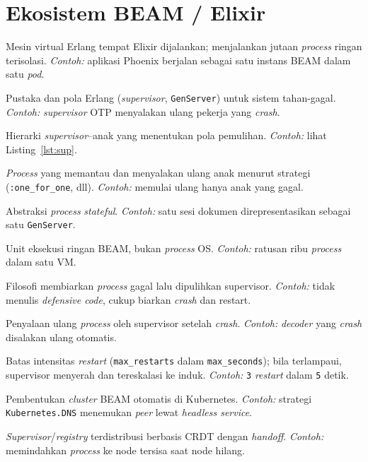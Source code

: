 \section{Ekosistem BEAM / Elixir}
\begin{description}[style=nextline,leftmargin=1.4em]
  \item[BEAM] Mesin virtual Erlang tempat Elixir dijalankan; menjalankan jutaan
    \emph{process} ringan terisolasi. \emph{Contoh:} aplikasi Phoenix berjalan sebagai
    satu instans BEAM dalam satu \emph{pod}.
  \item[OTP] Pustaka dan pola Erlang (\emph{supervisor}, \texttt{GenServer}) untuk sistem
    tahan-gagal. \emph{Contoh:} \emph{supervisor} OTP menyalakan ulang pekerja yang \emph{crash}.
  \item[Supervision tree] Hierarki \emph{supervisor}--anak yang menentukan pola pemulihan.
    \emph{Contoh:} lihat Listing~\ref{lst:sup}.
  \item[Supervisor] \emph{Process} yang memantau dan menyalakan ulang anak menurut
    strategi (\texttt{:one\_for\_one}, dll). \emph{Contoh:} memulai ulang hanya anak yang gagal.
  \item[GenServer] Abstraksi \emph{process} \emph{stateful}. \emph{Contoh:} satu sesi
    dokumen direpresentasikan sebagai satu \texttt{GenServer}.
  \item[Process (BEAM)] Unit eksekusi ringan BEAM, bukan \emph{process} OS.
    \emph{Contoh:} ratusan ribu \emph{process} dalam satu VM.
  \item[Let it crash] Filosofi membiarkan \emph{process} gagal lalu dipulihkan supervisor.
    \emph{Contoh:} tidak menulis \emph{defensive code}, cukup biarkan \emph{crash} dan restart.
  \item[Restart] Penyalaan ulang \emph{process} oleh supervisor setelah \emph{crash}.
    \emph{Contoh:} \emph{decoder} yang \emph{crash} disalakan ulang otomatis.
  \item[Restart-budget] Batas intensitas \emph{restart} (\texttt{max\_restarts} dalam
    \texttt{max\_seconds}); bila terlampaui, supervisor menyerah dan tereskalasi ke induk.
    \emph{Contoh:} \texttt{3} \emph{restart} dalam \texttt{5} detik.
  \item[libcluster] Pembentukan \emph{cluster} BEAM otomatis di Kubernetes. \emph{Contoh:}
    strategi \texttt{Kubernetes.DNS} menemukan \emph{peer} lewat \emph{headless service}.
  \item[Horde] \emph{Supervisor}/\emph{registry} terdistribusi berbasis CRDT dengan
    \emph{handoff}. \emph{Contoh:} memindahkan \emph{process} ke node tersisa saat node hilang.

\end{description}
